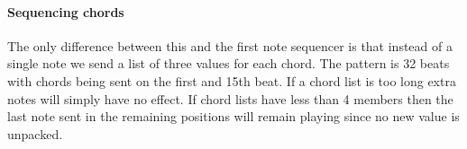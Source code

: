 \paragraph{Sequencing chords}
The only difference between this and the first note sequencer is that instead of a single note we send
a list of three values for each chord. The pattern is 32 beats with chords
being sent on the first and 15th beat. If a chord list is too long
extra notes will simply have no effect. If chord lists have less than 4
members then the last note sent in the remaining positions will remain playing
since no new value is unpacked.

